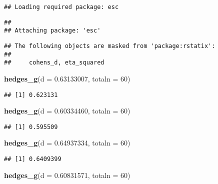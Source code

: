 \documentclass[
]{article}
\newenvironment{Shaded}{\begin{snugshade}}{\end{snugshade}}
\newcommand{\DataTypeTok}[1]{\textcolor[rgb]{0.13,0.29,0.53}{#1}}
\newcommand{\DecValTok}[1]{\textcolor[rgb]{0.00,0.00,0.81}{#1}}
\newcommand{\FloatTok}[1]{\textcolor[rgb]{0.00,0.00,0.81}{#1}}
\newcommand{\KeywordTok}[1]{\textcolor[rgb]{0.13,0.29,0.53}{\textbf{#1}}}
\newcommand{\NormalTok}[1]{#1}
\begin{document}
\begin{verbatim}
## Loading required package: esc
\end{verbatim}

\begin{verbatim}
## 
## Attaching package: 'esc'
\end{verbatim}

\begin{verbatim}
## The following objects are masked from 'package:rstatix':
## 
##     cohens_d, eta_squared
\end{verbatim}

\begin{Shaded}
\begin{Highlighting}[]
\KeywordTok{hedges_g}\NormalTok{(}\DataTypeTok{d =} \FloatTok{0.63133007}\NormalTok{, }\DataTypeTok{totaln =} \DecValTok{60}\NormalTok{)}
\end{Highlighting}
\end{Shaded}

\begin{verbatim}
## [1] 0.623131
\end{verbatim}

\begin{Shaded}
\begin{Highlighting}[]
\KeywordTok{hedges_g}\NormalTok{(}\DataTypeTok{d =} \FloatTok{0.60334460}\NormalTok{, }\DataTypeTok{totaln =} \DecValTok{60}\NormalTok{)}
\end{Highlighting}
\end{Shaded}

\begin{verbatim}
## [1] 0.595509
\end{verbatim}

\begin{Shaded}
\begin{Highlighting}[]
\KeywordTok{hedges_g}\NormalTok{(}\DataTypeTok{d =} \FloatTok{0.64937334}\NormalTok{, }\DataTypeTok{totaln =} \DecValTok{60}\NormalTok{)}
\end{Highlighting}
\end{Shaded}

\begin{verbatim}
## [1] 0.6409399
\end{verbatim}

\begin{Shaded}
\begin{Highlighting}[]
\KeywordTok{hedges_g}\NormalTok{(}\DataTypeTok{d =} \FloatTok{0.60831571}\NormalTok{, }\DataTypeTok{totaln =} \DecValTok{60}\NormalTok{)}
\end{Highlighting}
\end{Shaded}
\end{document}
